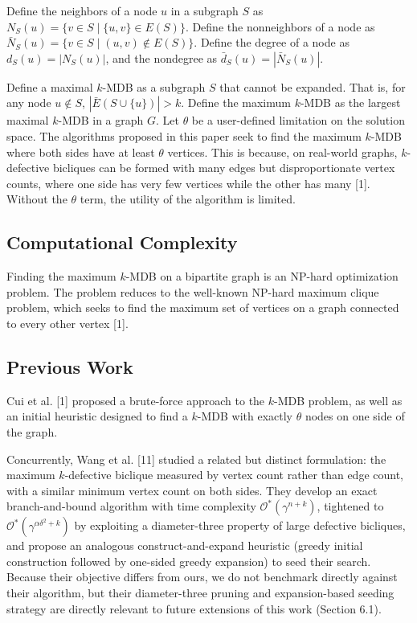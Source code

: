 \documentclass{article}
\begin{document}
Define the neighbors of a node $u$ in a subgraph $S$ as $N_S(u) = \{v \in S \mid \{u, v\} \in E(S)\}$. Define the nonneighbors of a node as $\bar{N}_S(u) = \{v \in S \mid (u, v) \not\in E(S)\}$. Define the degree of a node as $d_S(u) = |N_S(u)|$, and the nondegree as $\bar{d}_S(u) = |\bar{N}_S(u)|$.

Define a maximal $k$-MDB as a subgraph $S$ that cannot be expanded. That is, for any node $u \not\in S$, $|\bar{E}(S \cup \{u\})| > k$. Define the maximum $k$-MDB as the largest maximal $k$-MDB in a graph $G$. Let $\theta$ be a user-defined limitation on the solution space. The algorithms proposed in this paper seek to find the maximum $k$-MDB where both sides have at least $\theta$ vertices. This is because, on real-world graphs, $k$-defective bicliques can be formed with many edges but disproportionate vertex counts, where one side has very few vertices while the other has many [1]. Without the $\theta$ term, the utility of the algorithm is limited.

\subsection{Computational Complexity}

Finding the maximum $k$-MDB on a bipartite graph is an NP-hard optimization problem. The problem reduces to the well-known NP-hard maximum clique problem, which seeks to find the maximum set of vertices on a graph connected to every other vertex [1].

\subsection{Previous Work}

Cui et al. [1] proposed a brute-force approach to the $k$-MDB problem, as well as an initial heuristic designed to find a $k$-MDB with exactly $\theta$ nodes on one side of the graph.

Concurrently, Wang et al. [11] studied a related but distinct formulation: the maximum $k$-defective biclique measured by vertex count rather than edge count, with a similar minimum vertex count on both sides. They develop an exact branch-and-bound algorithm with time complexity $\mathcal{O}^*(\gamma^{n + k})$, tightened to
$\mathcal{O}^*(\gamma^{\alpha\delta^2 + k})$ by exploiting a diameter-three property of large defective bicliques, and propose an analogous construct-and-expand heuristic (greedy initial construction followed by one-sided greedy expansion) to seed their search.
Because their objective differs from ours, we do not benchmark directly against their algorithm, but their diameter-three pruning and expansion-based seeding strategy are directly relevant to future extensions of this work (Section 6.1).
\end{document}
